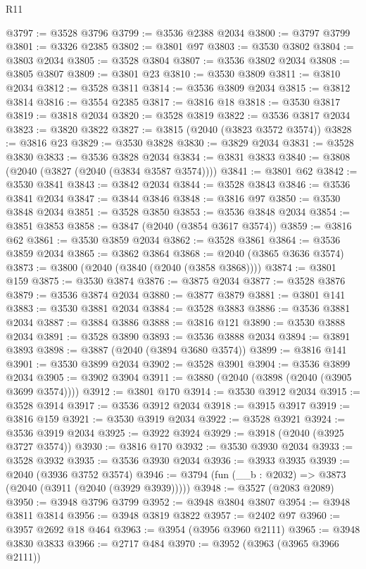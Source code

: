\begin{lexlean}{R11}
\begin{coremodule}
@3797 := @3528 @3796
@3799 := @3536 @2388 @2034
@3800 := @3797 @3799
@3801 := @3326 @2385
@3802 := @3801 @97
@3803 := @3530 @3802
@3804 := @3803 @2034
@3805 := @3528 @3804
@3807 := @3536 @3802 @2034
@3808 := @3805 @3807
@3809 := @3801 @23
@3810 := @3530 @3809
@3811 := @3810 @2034
@3812 := @3528 @3811
@3814 := @3536 @3809 @2034
@3815 := @3812 @3814
@3816 := @3554 @2385
@3817 := @3816 @18
@3818 := @3530 @3817
@3819 := @3818 @2034
@3820 := @3528 @3819
@3822 := @3536 @3817 @2034
@3823 := @3820 @3822
@3827 := @3815 (@2040 (@3823 @3572 @3574))
@3828 := @3816 @23
@3829 := @3530 @3828
@3830 := @3829 @2034
@3831 := @3528 @3830
@3833 := @3536 @3828 @2034
@3834 := @3831 @3833
@3840 := @3808 (@2040 (@3827 (@2040 (@3834 @3587 @3574))))
@3841 := @3801 @62
@3842 := @3530 @3841
@3843 := @3842 @2034
@3844 := @3528 @3843
@3846 := @3536 @3841 @2034
@3847 := @3844 @3846
@3848 := @3816 @97
@3850 := @3530 @3848 @2034
@3851 := @3528 @3850
@3853 := @3536 @3848 @2034
@3854 := @3851 @3853
@3858 := @3847 (@2040 (@3854 @3617 @3574))
@3859 := @3816 @62
@3861 := @3530 @3859 @2034
@3862 := @3528 @3861
@3864 := @3536 @3859 @2034
@3865 := @3862 @3864
@3868 := @2040 (@3865 @3636 @3574)
@3873 := @3800 (@2040 (@3840 (@2040 (@3858 @3868))))
@3874 := @3801 @159
@3875 := @3530 @3874
@3876 := @3875 @2034
@3877 := @3528 @3876
@3879 := @3536 @3874 @2034
@3880 := @3877 @3879
@3881 := @3801 @141
@3883 := @3530 @3881 @2034
@3884 := @3528 @3883
@3886 := @3536 @3881 @2034
@3887 := @3884 @3886
@3888 := @3816 @121
@3890 := @3530 @3888 @2034
@3891 := @3528 @3890
@3893 := @3536 @3888 @2034
@3894 := @3891 @3893
@3898 := @3887 (@2040 (@3894 @3680 @3574))
@3899 := @3816 @141
@3901 := @3530 @3899 @2034
@3902 := @3528 @3901
@3904 := @3536 @3899 @2034
@3905 := @3902 @3904
@3911 := @3880 (@2040 (@3898 (@2040 (@3905 @3699 @3574))))
@3912 := @3801 @170
@3914 := @3530 @3912 @2034
@3915 := @3528 @3914
@3917 := @3536 @3912 @2034
@3918 := @3915 @3917
@3919 := @3816 @159
@3921 := @3530 @3919 @2034
@3922 := @3528 @3921
@3924 := @3536 @3919 @2034
@3925 := @3922 @3924
@3929 := @3918 (@2040 (@3925 @3727 @3574))
@3930 := @3816 @170
@3932 := @3530 @3930 @2034
@3933 := @3528 @3932
@3935 := @3536 @3930 @2034
@3936 := @3933 @3935
@3939 := @2040 (@3936 @3752 @3574)
@3946 := @3794 (fun (__b : @2032) => @3873 (@2040 (@3911 (@2040 (@3929 @3939)))))
@3948 := @3527 (@2083 @2089)
@3950 := @3948 @3796 @3799
@3952 := @3948 @3804 @3807
@3954 := @3948 @3811 @3814
@3956 := @3948 @3819 @3822
@3957 := @2402 @97
@3960 := @3957 @2692 @18 @464
@3963 := @3954 (@3956 @3960 @2111)
@3965 := @3948 @3830 @3833
@3966 := @2717 @484
@3970 := @3952 (@3963 (@3965 @3966 @2111))

\end{coremodule}
\end{lexlean}
